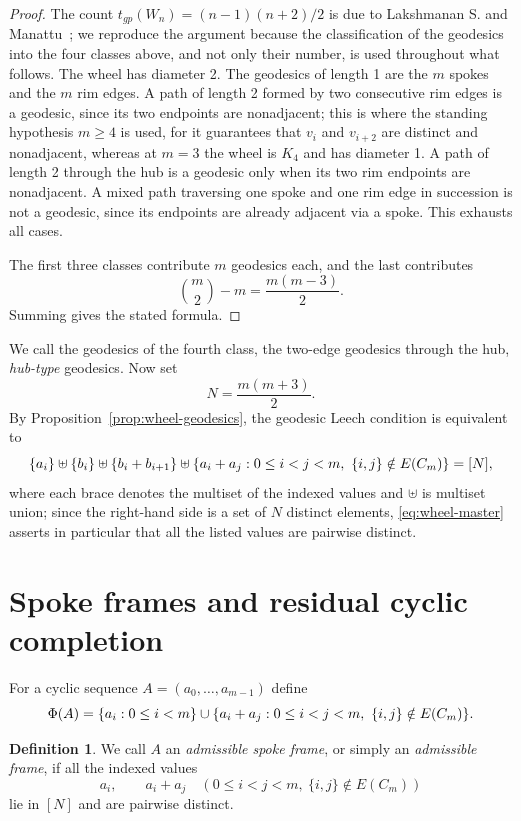 \documentclass[11pt]{article}
\theoremstyle{definition}
\newtheorem{definition}[theorem]{Definition}
\theoremstyle{remark}
\numberwithin{equation}{section}
\newcommand{\dd}{\mathbin{\uplus}}
\DeclarePairedDelimiter{\set}{\{}{\}}
\begin{document}
\begin{proof}
The count $t_{gp}(W_n)=(n-1)(n+2)/2$ is due to Lakshmanan S. and
Manattu~\cite[Theorem~3.1]{LakshmananManattu2025}; we reproduce the argument
because the classification of the geodesics into the four classes above, and not
only their number, is used throughout what follows.
The wheel has diameter 2. The geodesics of length 1 are the $m$ spokes and the $m$ rim edges. A path of length 2 formed by two consecutive rim edges is a geodesic, since its two endpoints are nonadjacent; this is where the standing hypothesis $m\ge4$ is used, for it guarantees that $v_i$ and $v_{i+2}$ are distinct and nonadjacent, whereas at $m=3$ the wheel is $K_4$ and has diameter 1. A path of length 2 through the hub is a geodesic only when its two rim endpoints are nonadjacent. A mixed path traversing one spoke and one rim edge in succession is not a geodesic, since its endpoints are already adjacent via a spoke. This exhausts all cases.

The first three classes contribute $m$ geodesics each, and the last contributes
\[
  \binom m2-m=\frac{m(m-3)}2.
\]
Summing gives the stated formula.
\end{proof}

We call the geodesics of the fourth class, the two-edge geodesics through the hub, \emph{hub-type} geodesics. Now set
\[
  N=\frac{m(m+3)}2.
\]
By Proposition~\ref{prop:wheel-geodesics}, the geodesic Leech condition is equivalent to
\begin{equation}\label{eq:wheel-master}
 \set{a_i}
 \dd \set{b_i}
 \dd \set{b_i+b_{i+1}}
 \dd \set{a_i+a_j:0\le i<j<m,\ \{i,j\}\notin E(C_m)}
 = [N],
\end{equation}
where each brace denotes the multiset of the indexed values and $\dd$ is multiset union; since the right-hand side is a set of $N$ distinct elements, \eqref{eq:wheel-master} asserts in particular that all the listed values are pairwise distinct.

\section{Spoke frames and residual cyclic completion}\label{sec:frame}

For a cyclic sequence $A=(a_0,\ldots,a_{m-1})$ define
\[
  \Phi(A)=
  \set{a_i:0\le i<m}
  \cup
  \set{a_i+a_j:0\le i<j<m,\ \{i,j\}\notin E(C_m)}.
\]

\begin{definition}
We call $A$ an \emph{admissible spoke frame}, or simply an \emph{admissible frame}, if all the indexed values
\[
  a_i,
  \qquad
  a_i+a_j\quad(0\le i<j<m,\ \{i,j\}\notin E(C_m))
\]
lie in $[N]$ and are pairwise distinct.
\end{definition}
\end{document}
